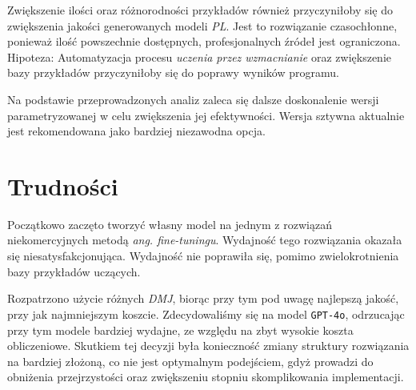 Zwiększenie ilości oraz różnorodności przykładów również przyczyniłoby się do zwiększenia jakości generowanych modeli \textit{PL}. Jest to rozwiązanie czasochłonne, ponieważ ilość powszechnie dostępnych, profesjonalnych źródeł jest ograniczona.
Hipoteza: Automatyzacja procesu \textit{uczenia przez wzmacnianie} oraz zwiększenie bazy przykładów przyczyniłoby się do poprawy wyników programu.

Na podstawie przeprowadzonych analiz zaleca się dalsze doskonalenie wersji parametryzowanej w celu zwiększenia jej efektywności. Wersja sztywna aktualnie jest rekomendowana jako bardziej niezawodna opcja.

\section{Trudności}

Początkowo zaczęto tworzyć własny model na jednym z rozwiązań niekomercyjnych metodą \textit{ang. fine-tuningu}. Wydajność tego rozwiązania okazała się niesatysfakcjonująca. Wydajność nie poprawiła się, pomimo zwielokrotnienia bazy przykładów uczących.


Rozpatrzono użycie różnych \textit{DMJ}, biorąc przy tym pod uwagę najlepszą jakość, przy jak najmniejszym koszcie. Zdecydowaliśmy się na model \texttt{GPT-4o}, odrzucając przy tym modele bardziej wydajne, ze względu na zbyt wysokie koszta obliczeniowe. Skutkiem tej decyzji była konieczność zmiany struktury rozwiązania na bardziej złożoną, co nie jest optymalnym podejściem, gdyż prowadzi do obniżenia przejrzystości oraz zwiększeniu stopniu skomplikowania implementacji.

